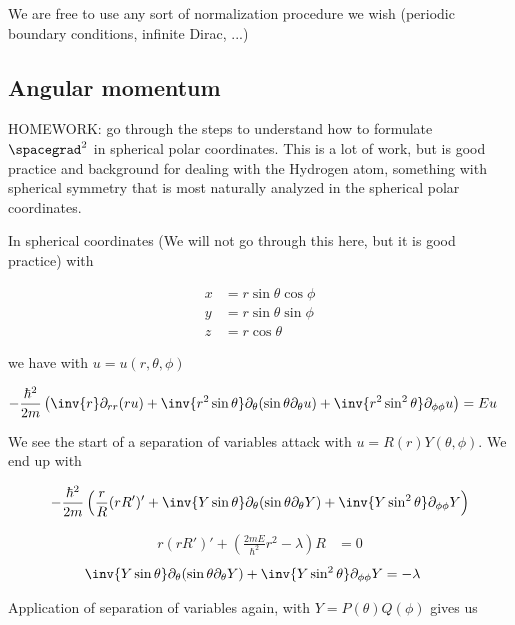 We are free to use any sort of normalization procedure we wish (periodic boundary conditions, infinite Dirac, ...)

\subsection{Angular momentum}

HOMEWORK: go through the steps to understand how to formulate $\spacegrad^2$ in spherical polar coordinates.  This is a lot of work, but is good practice and background for dealing with the Hydrogen atom, something with spherical symmetry that is most naturally analyzed in the spherical polar coordinates.

In spherical coordinates (We will not go through this here, but it is good practice) with

\begin{align*}
x &= r \sin\theta \cos\phi \\
y &= r \sin\theta \sin\phi \\
z &= r \cos\theta
\end{align*}

we have with $u = u(r,\theta, \phi)$

\begin{align*}
-\frac{\hbar^2}{2m} \left(
\inv{r} \partial_{rr} (r u) +  \inv{r^2 \sin\theta} \partial_\theta (\sin\theta \partial_\theta u)
+ \inv{r^2 \sin^2\theta} \partial_{\phi\phi} u
 \right)
&= E u
\end{align*}

We see the start of a separation of variables attack with $u = R(r) Y(\theta, \phi)$.  We end up with

\begin{align*}
-\frac{\hbar^2}{2m} &\left(
\frac{r}{R} (r R')' +  \inv{Y \sin\theta} \partial_\theta (\sin\theta \partial_\theta Y)
+ \inv{Y \sin^2\theta} \partial_{\phi\phi} Y
 \right) \\
\end{align*}

\begin{align*}
r (r R')' + \left( \frac{2m E}{\hbar^2} r^2 - \lambda \right) R &= 0
\end{align*}
\begin{align*}
\inv{Y \sin\theta} \partial_\theta (\sin\theta \partial_\theta Y) + \inv{Y \sin^2\theta} \partial_{\phi\phi} Y &= -\lambda
\end{align*}

Application of separation of variables again, with $Y = P(\theta) Q(\phi)$ gives us

